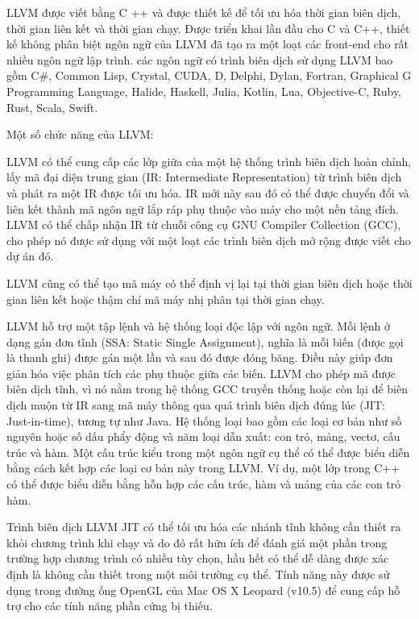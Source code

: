 \documentclass[12pt,a4paper]{article}
\begin{document}
LLVM được viết bằng C ++ và được thiết kế để tối ưu hóa thời gian biên dịch, thời gian liên kết và thời gian chạy. Được triển khai lần đầu cho C và C++, thiết kế không phân biệt ngôn ngữ của LLVM đã tạo ra một loạt các front-end cho rất nhiều ngôn ngữ lập trình. các ngôn ngữ có trình biên dịch sử dụng LLVM bao gồm C\#, Common Lisp, Crystal, CUDA, D, Delphi, Dylan, Fortran, Graphical G Programming Language, Halide, Haskell, Julia, Kotlin, Lua, Objective-C, Ruby, Rust, Scala, Swift.

Một số chức năng của LLVM:

LLVM có thể cung cấp các lớp giữa của một hệ thống trình biên dịch hoàn chỉnh, lấy mã đại diện trung gian (IR: Intermediate Representation) từ trình biên dịch và phát ra một IR được tối ưu hóa. IR mới này sau đó có thể được chuyển đổi và liên kết thành mã ngôn ngữ lắp ráp phụ thuộc vào máy cho một nền tảng đích. LLVM có thể chấp nhận IR từ chuỗi công cụ GNU Compiler Collection (GCC), cho phép nó được sử dụng với một loạt các trình biên dịch mở rộng được viết cho dự án đó.

LLVM cũng có thể tạo mã máy có thể định vị lại tại thời gian biên dịch hoặc thời gian liên kết hoặc thậm chí mã máy nhị phân tại thời gian chạy.

LLVM hỗ trợ một tập lệnh và hệ thống loại độc lập với ngôn ngữ. Mỗi lệnh ở dạng gán đơn tĩnh (SSA: Static Single Assignment), nghĩa là mỗi biến (được gọi là thanh ghi) được gán một lần và sau đó được đóng băng. Điều này giúp đơn giản hóa việc phân tích các phụ thuộc giữa các biến. LLVM cho phép mã được biên dịch tĩnh, vì nó nằm trong hệ thống GCC truyền thống hoặc còn lại để biên dịch muộn từ IR sang mã máy thông qua quá trình biên dịch đúng lúc (JIT: Just-in-time), tương tự như Java. Hệ thống loại bao gồm các loại cơ bản như số nguyên hoặc số dấu phẩy động và năm loại dẫn xuất: con trỏ, mảng, vectơ, cấu trúc và hàm. Một cấu trúc kiểu trong một ngôn ngữ cụ thể có thể được biểu diễn bằng cách kết hợp các loại cơ bản này trong LLVM. Ví dụ, một lớp trong C++ có thể được biểu diễn bằng hỗn hợp các cấu trúc, hàm và mảng của các con trỏ hàm.

Trình biên dịch LLVM JIT có thể tối ưu hóa các nhánh tĩnh không cần thiết ra khỏi chương trình khi chạy và do đó rất hữu ích để đánh giá một phần trong trường hợp chương trình có nhiều tùy chọn, hầu hết có thể dễ dàng được xác định là không cần thiết trong một môi trường cụ thể. Tính năng này được sử dụng trong đường ống OpenGL của Mac OS X Leopard (v10.5) để cung cấp hỗ trợ cho các tính năng phần cứng bị thiếu.
\end{document}
